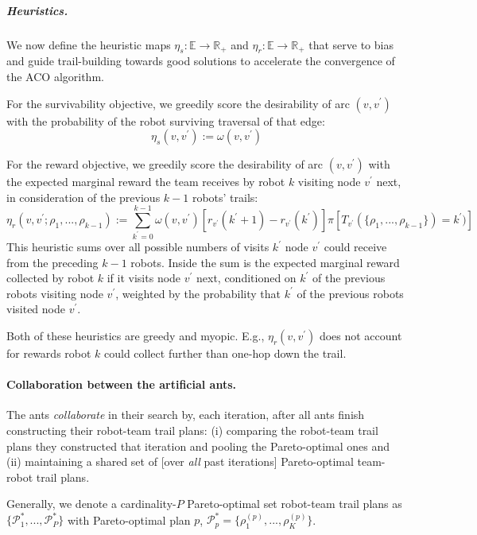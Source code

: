 \documentclass[11pt, oneside]{article}
\begin{document}
\subparagraph{Heuristics.} We now define the heuristic maps $\eta_s: \mathbb{E} \rightarrow \mathbb{R}_+$ and $\eta_r:  \mathbb{E} \rightarrow \mathbb{R}_+$ that serve to bias and guide trail-building towards good solutions to accelerate the convergence of the ACO algorithm. 

For the survivability objective, we greedily score the desirability of arc $(v, v^\prime)$ with the probability of the robot surviving traversal of that edge:
\begin{equation}
	\eta_s(v, v^\prime):=\omega(v, v^\prime) 
\end{equation}

For the reward objective, we greedily score the desirability of arc $(v, v^\prime)$ with the expected marginal reward the team receives by robot $k$ visiting node $v^\prime$ next, in consideration of the previous $k-1$ robots' trails:
\begin{equation}
	\eta_r(v, v^\prime; \rho_1, ..., \rho_{k-1}) :=  \sum_{k^\prime=0}^{k-1} \omega(v, v^\prime)  [r_{v^\prime}(k^\prime+1) - r_{v^\prime}(k^\prime)]
	 \pi[ T_{v^\prime}(\{\rho_1, ..., \rho_{k-1}\}) = k^\prime )]
\end{equation}
This heuristic sums over all possible numbers of visits $k^\prime$ node $v^\prime$ could receive from the preceding $k-1$ robots. Inside the sum is the expected marginal reward collected by robot $k$ if it visits node $v^\prime$ next, conditioned on $k^\prime$ of the previous robots visiting node $v^\prime$, weighted by the probability that $k^\prime$ of the previous robots visited node $v^\prime$.

Both of these heuristics are greedy and myopic. E.g., $\eta_r(v, v^\prime)$ does not account for rewards robot $k$ could collect further than one-hop down the trail. 

\paragraph{Collaboration between the artificial ants.}
The ants \emph{collaborate} in their search by, each iteration, after all ants finish constructing their robot-team trail plans:
(i) comparing the robot-team trail plans they constructed that iteration and pooling the Pareto-optimal ones and
(ii) maintaining a shared set of [over \emph{all} past iterations] Pareto-optimal team-robot trail plans.

Generally, we denote a cardinality-$P$ Pareto-optimal set robot-team trail plans as $\{\mathcal{P}_1^*, ..., \mathcal{P}_P^*\}$ with Pareto-optimal plan $p$, $\mathcal{P}^*_p=\{\rho_1^{(p)}, ..., \rho_K^{(p)}\}$.
\end{document}
